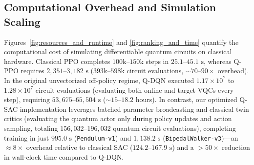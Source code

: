 \documentclass[conference]{IEEEtran}
\begin{document}
\subsection{Computational Overhead and Simulation Scaling}
Figures~\ref{fig:resources_and_runtime} and \ref{fig:ranking_and_time} quantify the computational cost of simulating differentiable quantum circuits on classical hardware. Classical PPO completes $100\text{k}$--$150\text{k}$ steps in $25.1$--$45.1\text{ s}$, whereas Q-PPO requires $2,351$--$3,182\text{ s}$ ($393\text{k}$--$598\text{k}$ circuit evaluations, $\sim 70$--$90\times$ overhead). In the original unvectorized off-policy regime, Q-DQN executed $1.17 \times 10^7$ to $1.28 \times 10^7$ circuit evaluations (evaluating both online and target VQCs every step), requiring $53,675$--$65,504\text{ s}$ ($\sim 15$--$18.2$ hours). In contrast, our optimized Q-SAC implementation leverages batched parameter broadcasting and classical twin critics (evaluating the quantum actor only during policy updates and action sampling, totaling $156,032$--$196,032$ quantum circuit evaluations), completing training in just $995.0\text{ s}$ (\texttt{Pendulum-v1}) and $1,138.2\text{ s}$ (\texttt{BipedalWalker-v3})---an $\approx 8\times$ overhead relative to classical SAC ($124.2$--$167.9\text{ s}$) and a $>50\times$ reduction in wall-clock time compared to Q-DQN.
\end{document}
